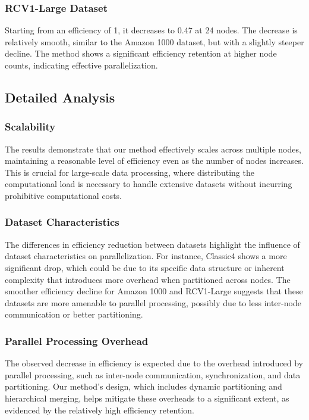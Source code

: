 \documentclass[journal]{IEEEtran}
\begin{document}
\subsubsection{RCV1-Large Dataset}
Starting from an efficiency of 1, it decreases to 0.47 at 24 nodes. The decrease is relatively smooth, similar to the Amazon 1000 dataset, but with a slightly steeper decline. The method shows a significant efficiency retention at higher node counts, indicating effective parallelization.

\subsection{Detailed Analysis}

\subsubsection{Scalability}
The results demonstrate that our method effectively scales across multiple nodes, maintaining a reasonable level of efficiency even as the number of nodes increases. This is crucial for large-scale data processing, where distributing the computational load is necessary to handle extensive datasets without incurring prohibitive computational costs.

\subsubsection{Dataset Characteristics}
The differences in efficiency reduction between datasets highlight the influence of dataset characteristics on parallelization. For instance, Classic4 shows a more significant drop, which could be due to its specific data structure or inherent complexity that introduces more overhead when partitioned across nodes. The smoother efficiency decline for Amazon 1000 and RCV1-Large suggests that these datasets are more amenable to parallel processing, possibly due to less inter-node communication or better partitioning.

\subsubsection{Parallel Processing Overhead}
The observed decrease in efficiency is expected due to the overhead introduced by parallel processing, such as inter-node communication, synchronization, and data partitioning. Our method's design, which includes dynamic partitioning and hierarchical merging, helps mitigate these overheads to a significant extent, as evidenced by the relatively high efficiency retention.
\end{document}
